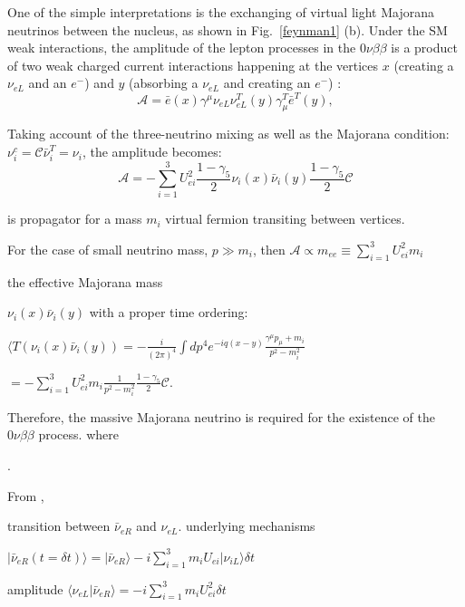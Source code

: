 One of the simple interpretations is the exchanging of virtual light Majorana neutrinos between the nucleus, as shown in Fig.~\ref{feynman1} (b). Under the SM weak interactions, the amplitude of the lepton processes in the $0\nu\beta\beta$ is a product of two weak charged current interactions happening at the vertices $x$ (creating a $\nu_{eL}$ and an $e^-$) and $y$ (absorbing a $\nu_{eL}$ and creating an $e^-$) \cite{antonio2018state}:
\begin{equation}
\mathcal{A}=\bar{e}(x)\gamma^\mu\nu_{eL}\nu^T_{eL}(y)\gamma_\mu^T\bar{e}^T(y),
\end{equation}

Taking account of the three-neutrino mixing as well as the Majorana condition: $\nu_i^c=\mathcal{C}\bar{\nu}_i^T=\nu_i$,
 the amplitude becomes\cite{antonio2018state,bilenky2018introduction}:
\begin{equation}
\mathcal{A}=-\sum^3_{i=1}U^2_{ei}\frac{1-\gamma_5}{2}\nu_i(x)\bar{\nu}_i(y)  \frac{1-\gamma_5}{2}\mathcal{C}
\end{equation}

is propagator for a mass $m_i$ virtual fermion transiting between vertices. 

For the case of small neutrino mass, $p\gg m_i$, then $\mathcal{A}\propto m_{ee}\equiv \sum^3_{i=1}U^2_{ei}m_i$

the effective Majorana mass 

$\nu_i(x)\bar{\nu}_i(y)$ with a proper time ordering:

$\langle T(\nu_i(x)\bar{\nu}_i(y))=-\frac{i}{(2\pi)^4}\int dp^4 e^{-iq(x-y)}\frac{\gamma^\mu p_\mu+m_i}{p^2-m_i^2}$

$=-\sum^3_{i=1}U^2_{ei}m_i\frac{1}{p^2-m_i^2}\frac{1-\gamma_5}{2}\mathcal{C}.$

Therefore, the massive Majorana neutrino is required for the existence of the $0\nu\beta\beta$ process.
where 







\cite{dolinski2019neutrinoless}.

From \cite{pdg2018},


transition between $\bar{\nu}_{eR}$ and $\nu_{eL}$.
underlying mechanisms 

$|\bar{\nu}_{eR} (t=\delta t)\rangle  =|\bar{\nu}_{eR}\rangle-i\sum^3_{i=1}m_i U_{ei}|\nu_{iL} \rangle\delta t$

amplitude $\langle \nu_{eL}|\bar{\nu}_{eR}\rangle=-i\sum^3_{i=1}m_iU^2_{ei}\delta t$



